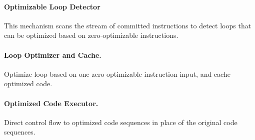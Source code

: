 \paragraph{Optimizable Loop Detector} This mechanism scans the stream of committed instructions to detect loops that can be optimized based on zero-optimizable instructions. 
 
\paragraph{Loop Optimizer and Cache.}  Optimize loop based on one zero-optimizable instruction input, and cache optimized code. 
 
 \paragraph{Optimized Code Executor.} Direct control flow to optimized code sequences in place of the original code sequences.   
 
 
